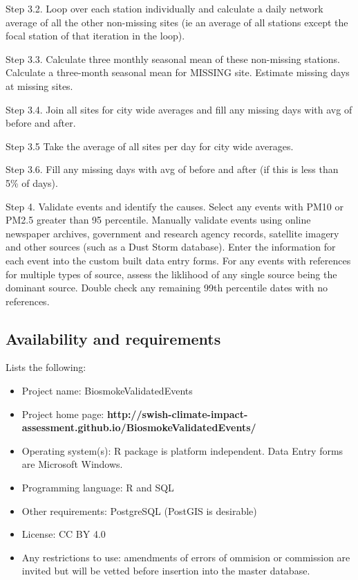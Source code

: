 Step 3.2. Loop over each station individually and calculate a daily
network average of all the other non-missing sites (ie an average of all
stations except the focal station of that iteration in the loop).

Step 3.3. Calculate three monthly seasonal mean of these non-missing
stations. Calculate a three-month seasonal mean for MISSING site.
Estimate missing days at missing sites.

Step 3.4. Join all sites for city wide averages and fill any missing
days with avg of before and after.

Step 3.5 Take the average of all sites per day for city wide averages.

Step 3.6. Fill any missing days with avg of before and after (if this is
less than 5\% of days).

Step 4. Validate events and identify the causes. Select any events with
PM10 or PM2.5 greater than 95 percentile. Manually validate events using
online newspaper archives, government and research agency records,
satellite imagery and other sources (such as a Dust Storm database).
Enter the information for each event into the custom built data entry
forms. For any events with references for multiple types of source,
assess the liklihood of any single source being the dominant source.
Double check any remaining 99th percentile dates with no references.

\subsection{Availability and
requirements}\label{availability-and-requirements}

Lists the following:

\begin{itemize}
\itemsep1pt\parskip0pt
\item
  Project name: BiosmokeValidatedEvents
\item
  Project home page:
  \textbf{http://swish-climate-impact-assessment.github.io/BiosmokeValidatedEvents/}
\item
  Operating system(s): R package is platform independent. Data Entry
  forms are Microsoft Windows.
\item
  Programming language: R and SQL
\item
  Other requirements: PostgreSQL (PostGIS is desirable)
\item
  License: CC BY 4.0
\item
  Any restrictions to use: amendments of errors of ommision or
  commission are invited but will be vetted before insertion into the
  master database.
\end{itemize}

